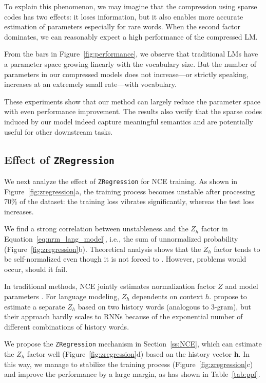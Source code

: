 \documentclass[11pt]{article}
\renewcommand{\vector}[1]{\bm{#1}}
\begin{document}
To explain this phenomenon, we may imagine that the compression using sparse codes  has two effects: it loses information, but it also enables more accurate estimation of parameters especially for rare words. When the second factor dominates, we can reasonably expect a high performance of the compressed LM.

From the bars in Figure~\ref{fig:performance}, we observe that traditional LMs have a parameter space growing linearly with the vocabulary size. But the number of parameters in our compressed models does not increase---or strictly speaking, increases at an extremely small rate---with vocabulary.

These experiments show that our method can largely reduce the parameter space with even performance improvement. The results also verify that the sparse codes induced by our model indeed capture meaningful semantics and are potentially useful for other downstream tasks.



\subsection{Effect of \texttt{ZRegression}}\label{ss:eval.zregression}


We next analyze the effect of \texttt{ZRegression} for NCE training. As shown in Figure~\ref{fig:zregression}a, the training process becomes unstable after processing 70\% of the dataset: the training loss vibrates significantly, whereas the test loss increases.

We find a strong correlation between unstableness and the $Z_h$ factor in Equation~\eqref{eq:nrm_lang_model}, i.e., the sum of unnormalized probability (Figure~\ref{fig:zregression}b). Theoretical analysis shows that the $Z_h$ factor tends to be self-normalized even though it is not forced to \cite{Gutmann:2012tr}.
However, problems would occur, should it fail.

In traditional methods, NCE jointly estimates normalization factor $Z$ and model parameters \cite{Gutmann:2012tr}. For language modeling, $Z_h$ dependents on context $h$.  propose to estimate a separate $Z_h$ based on two history words (analogous to 3-gram), but their approach hardly scales to RNNs because of the exponential number of different combinations of history words.

We propose the \texttt{ZRegression} mechanism in Section~\ref{ss:NCE}, which can estimate the $Z_h$ factor well (Figure~\ref{fig:zregression}d) based on the history vector $\vector{h}$. In this way, we manage to stabilize the training process (Figure~\ref{fig:zregression}c) and improve the performance by a large margin, as has shown in Table~\ref{tab:ppl}.
\end{document}

